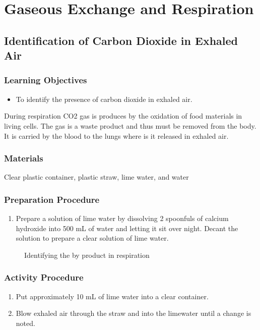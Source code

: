 \section{Gaseous Exchange and Respiration}

\subsection{Identification of Carbon Dioxide in Exhaled Air}

\subsubsection*{Learning Objectives}
\begin{itemize}
\item{To identify the presence of carbon dioxide in exhaled air.}
\end{itemize}


During respiration CO2 gas is produces by the oxidation of food materials in living cells. The gas is a waste product and thus must be removed from the body. It is carried by the blood to the lungs where is it released in exhaled air.

\subsubsection*{Materials}
Clear plastic container, plastic straw, lime water, and water

\subsubsection*{Preparation Procedure}
\begin{enumerate}
\item{Prepare a solution of lime water by dissolving 2 spoonfuls of calcium hydroxide into 500 mL of water and letting it sit over night. Decant the solution to prepare a clear solution of lime water.}
\end{enumerate}

\begin{figure}
\begin{center}
\def\svgwidth{2cm}

\caption{Identifying the by product  in respiration}
\label{fig:CO2-limewater}
\end{center}
\end{figure}

\subsubsection*{Activity Procedure}
\begin{enumerate}
\item{Put approximately 10 mL of lime water into a clear container.}
\item{Blow exhaled air through the straw and into the limewater until a change is noted.}
\end{enumerate}

